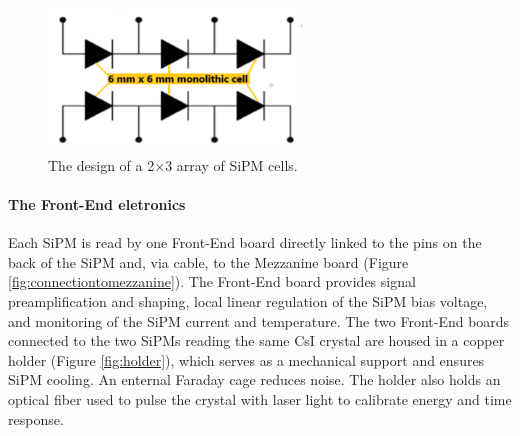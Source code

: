 \begin{figure}[!h]
    \centering
    \includegraphics[width =0.6\textwidth]{figures/png/Screenshot_20240706_141625.png}
    \caption[The design of SiPM cells.]{The design of a 2$\times$3 array of SiPM cells.}
    \label{fig:sipmcell}
\end{figure}
\paragraph{The Front-End eletronics}
Each SiPM is read by one Front-End board directly linked to the pins on the 
back of the SiPM and, via cable, to the Mezzanine board (Figure \ref{fig:connectiontomezzanine}). 
The Front-End board provides signal preamplification and shaping, local linear 
regulation of the SiPM bias voltage, and monitoring of the SiPM current and temperature. 
The two Front-End boards connected to the two SiPMs reading the same CsI 
crystal are housed in a copper holder (Figure \ref{fig:holder}), which 
serves as a mechanical support and ensures SiPM cooling. 
An enternal Faraday cage reduces  noise. The holder also holds 
an optical fiber used to pulse the crystal with  laser light to 
calibrate  energy and time response.
